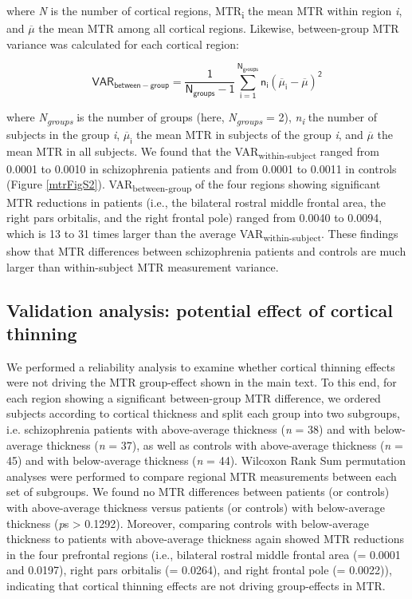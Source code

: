 \begin{refsection}
where \textit{N} is the number of cortical regions, MTR\textsubscript{i} the mean MTR within region \textit{i}, and $\mathsf{\overline{\mu}}$ the mean MTR among all cortical regions. Likewise, between-group MTR variance was calculated for each cortical region:

\[\mathsf{VAR_{between-group} = \frac{1}{N_{groups}-1} \sum_{i=1}^{N_{groups}} n_{i}(\overline{\mu}_{i} - \overline{\mu})^2}\]

where \textit{N\textsubscript{groups}} is the number of groups (here, \textit{N\textsubscript{groups}} = 2), \textit{n\textsubscript{i}} the number of subjects in the group \textit{i}, $\mathsf{\overline{\mu}_{i}}$ the mean MTR in subjects of the group \textit{i}, and $\mathsf{\overline{\mu}}$ the mean MTR in all subjects. We found that the VAR\textsubscript{within-subject} ranged from 0.0001 to 0.0010 in schizophrenia patients and from 0.0001 to 0.0011 in controls (Figure \ref{mtrFigS2}). VAR\textsubscript{between-group} of the four regions showing significant MTR reductions in patients (i.e., the bilateral rostral middle frontal area, the right pars orbitalis, and the right frontal pole) ranged from 0.0040 to 0.0094, which is 13 to 31 times larger than the average VAR\textsubscript{within-subject}. These findings show that MTR differences between schizophrenia patients and controls are much larger than within-subject MTR measurement variance.

\subsection*{Validation analysis: potential effect of cortical thinning}
We performed a reliability analysis to examine whether cortical thinning effects were not driving the MTR group-effect shown in the main text. To this end, for each region showing a significant between-group MTR difference, we ordered subjects according to cortical thickness and split each group into two subgroups, i.e. schizophrenia patients with above-average thickness (\textit{n} = 38) and with below-average thickness (\textit{n} = 37), as well as controls with above-average thickness (\textit{n} = 45) and with below-average thickness (\textit{n} = 44). Wilcoxon Rank Sum permutation analyses were performed to compare regional MTR measurements between each set of subgroups. We found no MTR differences between patients (or controls) with above-average thickness versus patients (or controls) with below-average thickness (\textit{p}s > 0.1292). Moreover, comparing controls with below-average thickness to patients with above-average thickness again showed MTR reductions in the four prefrontal regions (i.e., bilateral rostral middle frontal area (\pval = 0.0001 and 0.0197), right pars orbitalis (\pval = 0.0264), and right frontal pole (\pval = 0.0022)), indicating that cortical thinning effects are not driving group-effects in MTR.


\end{refsection}
